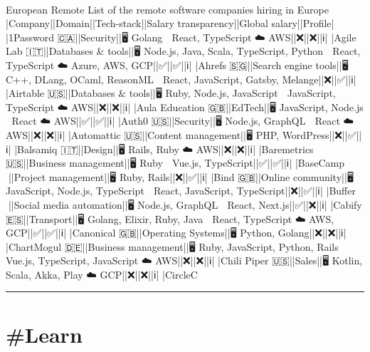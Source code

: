 \documentclass[10pt,a4paper]{article}
\begin{document}
\begin{multicols}{2}
\paragraph{}
European Remote
List of the remote software companies hiring in Europe
|Company||Domain||Tech-stack||Salary transparency||Global salary||Profile|
|1Password 🇨🇦||Security||🖥 Golang 🎨 React, TypeScript ☁️ AWS||❌||❌||ℹ️|
|Agile Lab 🇮🇹||Databases \& tools||🖥 Node.js, Java, Scala, TypeScript, Python 🎨 React, TypeScript ☁️ Azure, AWS, GCP||✅||✅||ℹ️|
|Ahrefs 🇸🇬||Search engine tools||🖥 C++, DLang, OCaml, ReasonML 🎨 React, JavaScript, Gatsby, Melange||❌||✅||ℹ️|
|Airtable 🇺🇸||Databases \& tools||🖥 Ruby, Node.js, JavaScript 🎨 JavaScript, TypeScript ☁️ AWS||❌||❌||ℹ️|
|Aula Education 🇬🇧||EdTech||🖥 JavaScript, Node.js 🎨 React ☁️ AWS||✅||✅||ℹ️|
|Auth0 🇺🇸||Security||🖥 Node.js, GraphQL 🎨 React ☁️ AWS||❌||❌||ℹ️|
|Automattic 🇺🇸||Content management||🖥 PHP, WordPress||❌||✅||ℹ️|
|Balsamiq 🇮🇹||Design||🖥 Rails, Ruby ☁️ AWS||❌||❌||ℹ️|
|Baremetrics 🇺🇸||Business management||🖥 Ruby 🎨 Vue.js, TypeScript||✅||✅||ℹ️|
|BaseCamp 🏡||Project management||🖥 Ruby, Rails||❌||✅||ℹ️|
|Bind 🇬🇧||Online community||🖥 JavaScript, Node.js, TypeScript 🎨 React, JavaScript, TypeScript||❌||✅||ℹ️|
|Buffer 🏡||Social media automation||🖥 Node.js, GraphQL 🎨 React, Next.js||✅||❌||ℹ️|
|Cabify 🇪🇸||Transport||🖥 Golang, Elixir, Ruby, Java 🎨 React, TypeScript ☁️ AWS, GCP||✅||✅||ℹ️|
|Canonical 🇬🇧||Operating Systems||🖥 Python, Golang||❌||❌||ℹ️|
|ChartMogul 🇩🇪||Business management||🖥 Ruby, JavaScript, Python, Rails 🎨 Vue.js, TypeScript, JavaScript ☁️ AWS||❌||❌||ℹ️|
|Chili Piper 🇺🇸||Sales||🖥 Kotlin, Scala, Akka, Play ☁️ GCP||❌||❌||ℹ️|
|CircleC
\par\noindent\textcolor{red}{\rule{\linewidth}{0.2mm}}
\vfill
\null
\end{multicols}

\newpage
\section{\#Learn}
\end{document}
